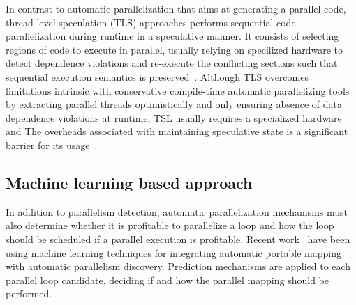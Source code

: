 \documentclass[a4paper,12pt]{article}
\begin{document}
In contrast to automatic parallelization that aims at generating a parallel
code, thread-level speculation (TLS) approaches performs sequential code
parallelization during runtime in a speculative manner.  It consists of
selecting regions of code to execute in parallel, usually relying on specilized hardware to
detect dependence violations and re-execute the conflicting sections such that
sequential execution semantics is preserved~\cite{hammond98,chen03,wu08}.
Although TLS overcomes limitations intrinsic with conservative compile-time
automatic parallelizing tools by extracting parallel threads optimistically and
only ensuring absence of data dependence violations at runtime, TSL usually requires
a specialized hardware and The overheads associated with
maintaining speculative state is a significant barrier for its usage~\cite{yiapanis13}.

%
%

\subsection{Machine learning based approach}

In addition to parallelism detection, automatic parallelization mechanisms
must also determine whether it is profitable to parallelize a loop and how the
loop should be scheduled if a parallel execution is profitable.
Recent work~\cite{wang09,tournavitis09,wang14a} have been using machine learning
techniques for integrating automatic portable mapping with automatic parallelism
discovery.
Prediction mechanisms are applied
to each parallel loop candidate, deciding if and how the parallel mapping
should be performed.
\end{document}

